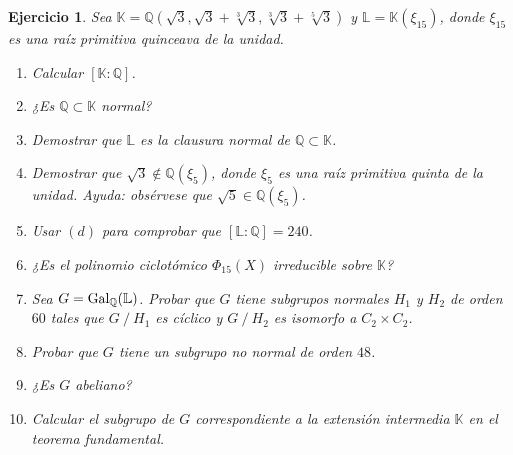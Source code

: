 \documentclass[11pt]{report}
\newcommand{\Q}{\mathbb Q}
\newcommand{\K}{\mathbb K}
\renewcommand{\L}{\mathbb L}
\newtheorem{ejercicio}{Ejercicio}
\begin{document}
\begin{ejercicio}
    Sea $\K = \Q(\sqrt{3},\sqrt{3}+\sqrt[3]{3},\sqrt[3]{3}+\sqrt[5]{3})$ y $\L = \K(\xi_{15})$, donde $\xi_{15}$ es una raíz primitiva quinceava de la unidad.
    \begin{enumerate}
        \item Calcular $[\K \colon \Q]$.
        \item ¿Es $\Q \subset \K$ normal?
        \item Demostrar que $\L$ es la clausura normal de $\Q \subset \K$.
        \item Demostrar que $\sqrt{3} \not\in \Q(\xi_5)$, donde $\xi_{5}$ es una raíz primitiva quinta de la unidad. \emph{Ayuda}: obsérvese que $\sqrt{5} \in \Q(\xi_5)$.
        \item Usar $(d)$ para comprobar que $[\L \colon \Q] = 240$.
        \item ¿Es el polinomio ciclotómico $\Phi_{15}(X)$ irreducible sobre $\K$?
        \item Sea $G = \textup{Gal}_\Q(\L)$. Probar que $G$ tiene subgrupos normales $H_1$ y $H_2$ de orden $60$ tales que $G \ / \ H_1$ es cíclico y $G \ / \ H_2$ es isomorfo a $C_2 \times C_2$.
        \item Probar que $G$ tiene un subgrupo no normal de orden $48$.
        \item ¿Es $G$ abeliano?
        \item Calcular el subgrupo de $G$ correspondiente a la extensión intermedia $\K$ en el teorema fundamental.
    \end{enumerate}
\end{ejercicio}
\end{document}
